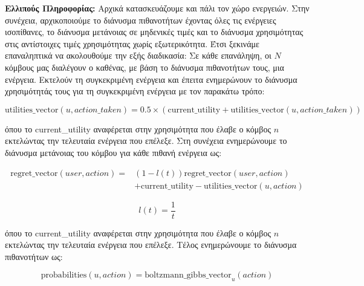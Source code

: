 \textbf{Ελλιπούς Πληροφορίας:} Αρχικά κατασκευάζουμε και πάλι τον χώρο ενεργειών. Στην συνέχεια, αρχικοποιούμε το διάνυσμα πιθανοτήτων έχοντας όλες τις ενέργειες ισοπίθανες, το διάνυσμα μετάνοιας σε μηδενικές τιμές και το διάνυσμα χρησιμότητας στις αντίστοιχες τιμές χρησιμότητας χωρίς εξωτερικότητα. Έτσι ξεκινάμε επαναληπτικά να ακολουθούμε την εξής διαδικασία: Σε κάθε επανάληψη, οι $N$ κόμβους μας διαλέγουν ο καθένας, με βάση το διάνυσμα πιθανοτήτων τους, μια ενέργεια. Εκτελούν τη συγκεκριμένη ενέργεια και έπειτα ενημερώνουν το διάνυσμα χρησιμότητάς τους για τη συγκεκριμένη ενέργεια με τον παρακάτω τρόπο:

\vspace{-5pt}

\begin{equation}
    \text{utilities\_vector}(u,action\_taken) = 0.5 \times \left(\text{current\_utility} + \text{utilities\_vector}(u,action\_taken)\right)
\label{eq29}
\end{equation}

\vspace{-3pt}

\noindent
όπου το current\_utility αναφέρεται στην χρησιμότητα που έλαβε ο κόμβος $n$ εκτελώντας την τελευταία ενέργεια που επέλεξε. Στη συνέχεια ενημερώνουμε το διάνυσμα μετάνοιας του κόμβου για κάθε πιθανή ενέργεια ως:

\vspace{-5pt}

\begin{equation}
\begin{split}
    \text{regret\_vector}(user, action) =& \left(1 - l(t)\right) \text{regret\_vector}(user, action)\\
    &+ \text{current\_utility} - \text{utilities\_vector}(u,action)
\end{split}
\label{eq30}
\end{equation}

\vspace{-3pt}

\[l(t) = \frac{1}{t}\]

όπου το current\_utility αναφέρεται στην χρησιμότητα που έλαβε ο κόμβος $n$ εκτελώντας την τελευταία ενέργεια που επέλεξε. Τέλος ενημερώνουμε το διάνυσμα πιθανοτήτων ως:

\vspace{-5pt}

\begin{equation}
    \text{probabilities}(u,action) = \text{boltzmann\_gibbs\_vector}_u(action)
\label{eq31}
\end{equation}

